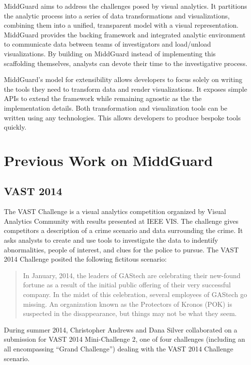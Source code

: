 \documentclass[midd]{thesis}
\begin{document}
MiddGuard aims to address the challenges posed by visual analytics. It
partitions the analytic process into a series of data transformations and
visualizations, combining them into a unified, transparent model with a visual
representation. MiddGuard provides the backing framework and integrated analytic
environment to communicate data between teams of investigators and load/unload
visualizations. By building on MiddGuard instead of implementing this
scaffolding themselves, analysts can devote their time to the investigative
process.

MiddGuard's model for extensibility allows developers to focus solely on writing
the tools they need to transform data and render visualizations. It exposes
simple APIs to extend the framework while remaining agnostic as the the
implementation details. Both transformation and visualization tools can be
written using any technologies. This allows developers to produce bespoke tools
quickly.

\section{Previous Work on MiddGuard}

\subsection{VAST 2014}

The VAST Challenge is a visual analytics competition organized by Visual
Analytics Community with results presented at IEEE VIS. The challenge gives
competitors a description of a crime scenario and data surrounding the crime. It
asks analysts to create and use tools to investigate the data to indentify
abnormalities, people of interest, and clues for the police to pursue. The VAST
2014 Challenge \cite{vast2014} posited the following fictitous scenario:

\begin{quote}
In January, 2014, the leaders of GAStech are celebrating their new-found fortune
as a result of the initial public offering of their very successful company. In
the midst of this celebration, several employees of GAStech go missing. An
organization known as the Protectors of Kronos (POK) is suspected in the
disappearance, but things may not be what they seem.
\end{quote}

During summer 2014, Christopher Andrews and Dana Silver collaborated on a
submission for VAST 2014 Mini-Challenge 2, one of four challenges (including an
all encompassing ``Grand Challenge'') dealing with the VAST 2014 Challenge
scenario.
\end{document}

